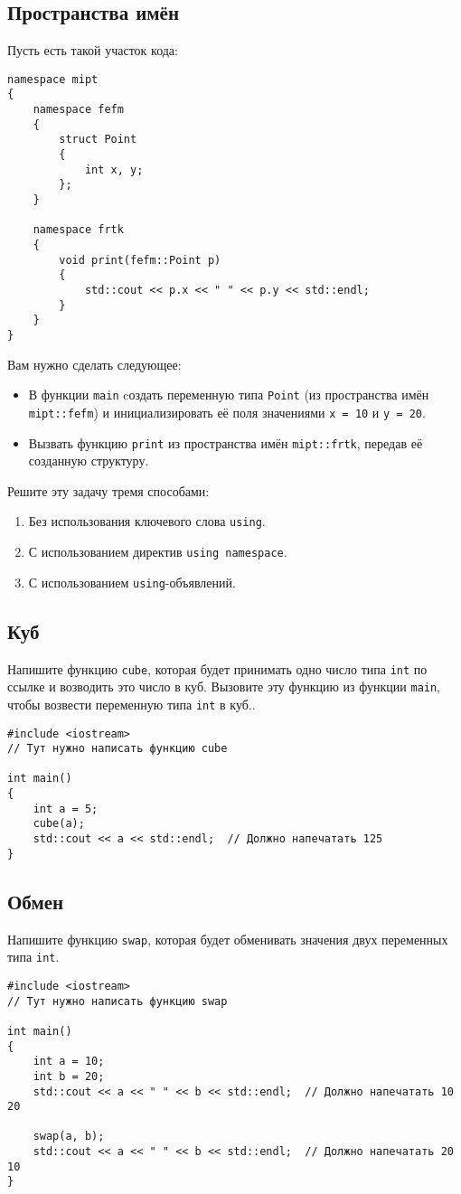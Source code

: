 \documentclass{article}
\begin{document}
\subsection{Пространства имён}
Пусть есть такой участок кода:
\begin{lstlisting}
namespace mipt
{
	namespace fefm
	{
		struct Point
		{
			int x, y;
		};
	}
	
	namespace frtk
	{
		void print(fefm::Point p)
		{
			std::cout << p.x << " " << p.y << std::endl;
		}
	}
}
\end{lstlisting}
Вам нужно сделать следующее:
\begin{itemize}
\item В функции \texttt{main} cоздать переменную типа \texttt{Point} (из пространства имён \texttt{mipt::fefm}) и инициализировать её поля значениями \texttt{x = 10} и \texttt{y = 20}.
\item Вызвать функцию \texttt{print} из пространства имён \texttt{mipt::frtk}, передав её созданную структуру.
\end{itemize}
Решите эту задачу тремя способами:
\begin{enumerate}
\item Без использования ключевого слова \texttt{using}.
\item С использованием директив \texttt{using namespace}.
\item С использованием \texttt{using}-объявлений.
\end{enumerate}

\subsection{Куб}
Напишите функцию \texttt{cube}, которая будет принимать одно число типа \texttt{int} по ссылке и возводить это число в куб. Вызовите эту функцию из функции \texttt{main}, чтобы возвести переменную типа \texttt{int} в куб..
\begin{lstlisting}
#include <iostream>
// Тут нужно написать функцию cube

int main()
{
	int a = 5;
	cube(a);
	std::cout << a << std::endl;  // Должно напечатать 125
}
\end{lstlisting}


\subsection{Обмен}
Напишите функцию \texttt{swap}, которая будет обменивать значения двух переменных типа \texttt{int}.
\begin{lstlisting}
#include <iostream>
// Тут нужно написать функцию swap

int main()
{
	int a = 10;
	int b = 20;
	std::cout << a << " " << b << std::endl;  // Должно напечатать 10 20
	
	swap(a, b);
	std::cout << a << " " << b << std::endl;  // Должно напечатать 20 10
}
\end{lstlisting}
\end{document}
